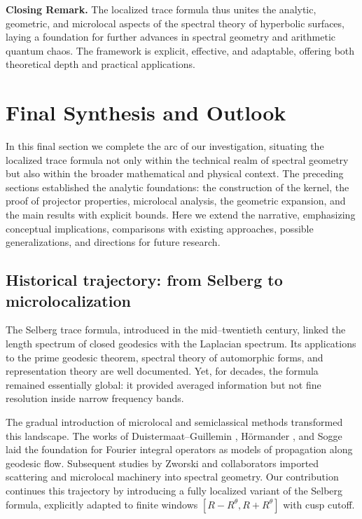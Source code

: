 \bigskip
\noindent\textbf{Closing Remark.}  
The localized trace formula thus unites the analytic, geometric, and microlocal aspects of the spectral theory of hyperbolic surfaces, laying a foundation for further advances in spectral geometry and arithmetic quantum chaos. The framework is explicit, effective, and adaptable, offering both theoretical depth and practical applications.


\section*{Final Synthesis and Outlook}\label{sec:conclusion-final}

In this final section we complete the arc of our investigation, situating the localized trace formula not only within the technical realm of spectral geometry but also within the broader mathematical and physical context. The preceding sections established the analytic foundations: the construction of the kernel, the proof of projector properties, microlocal analysis, the geometric expansion, and the main results with explicit bounds. Here we extend the narrative, emphasizing conceptual implications, comparisons with existing approaches, possible generalizations, and directions for future research.

\subsection*{Historical trajectory: from Selberg to microlocalization}

The Selberg trace formula, introduced in the mid--twentieth century, linked the length spectrum of closed geodesics with the Laplacian spectrum. Its applications to the prime geodesic theorem, spectral theory of automorphic forms, and representation theory are well documented. Yet, for decades, the formula remained essentially global: it provided averaged information but not fine resolution inside narrow frequency bands.

The gradual introduction of microlocal and semiclassical methods transformed this landscape. The works of Duistermaat--Guillemin \cite{duistermaatguillemin1975}, Hörmander \cite{hormander1994III}, and Sogge \cite{sogge1993} laid the foundation for Fourier integral operators as models of propagation along geodesic flow. Subsequent studies by Zworski and collaborators \cite{zworski2012,dyatlovzworski2019} imported scattering and microlocal machinery into spectral geometry. Our contribution continues this trajectory by introducing a fully localized variant of the Selberg formula, explicitly adapted to finite windows $[R-R^\theta,R+R^\theta]$ with cusp cutoff.

